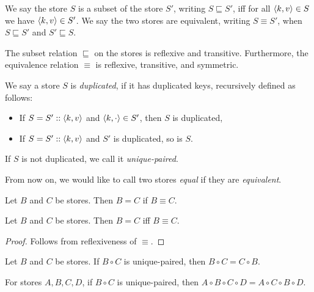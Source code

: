 \begin{definition}[Equivalence]
We say the store $S$ is a subset of the store $S'$, writing $S \sqsubseteq S'$, iff for all $\langle k, v \rangle \in S$ we have $\langle k, v \rangle \in S'$. We say the two stores are equivalent, writing $S \equiv S'$, when $S \sqsubseteq S'$ and $S' \sqsubseteq S$.
\end{definition}

\begin{lemma}
The subset relation $\sqsubseteq$ on the stores is reflexive and transitive. Furthermore, the equivalence relation $\equiv$ is reflexive, transitive, and symmetric.
\end{lemma}

\begin{definition}
We say a store $S$ is \textit{duplicated}, if it has duplicated keys, recursively defined as follows:
\begin{itemize}
    \item If $S = S' :: \langle k, v \rangle$ and $\left\langle k, \cdot \right\rangle \in S'$, then $S$ is duplicated,
    \item If $S = S' :: \langle k, v \rangle$ and $S'$ is duplicated, so is $S$.
\end{itemize}
If $S$ is not duplicated, we call it \textit{unique-paired}.
\end{definition}

From now on, we would like to call two stores \textit{equal} if they are \textit{equivalent}.

\begin{axiom}[Extensionality]
\label{axiom:extentionality}
Let $B$ and $C$ be stores. Then $B = C$ if $B \equiv C$.
\end{axiom}

\begin{corollary}
Let $B$ and $C$ be stores. Then $B = C$ iff $B \equiv C$.
\end{corollary}
\begin{proof}
Follows from reflexiveness of $\equiv$.
\end{proof}

\begin{theorem}[Commute]
\label{theorem:commute}
Let $B$ and $C$ be stores. If $B \circ C$ is unique-paired, then $B \circ C = C \circ B$.
\end{theorem}

\begin{corollary}[Exchange]
\label{corollary:exchange}
For stores $A, B, C, D$, if $B \circ C$ is unique-paired, then $A \circ B \circ C \circ D = A \circ C \circ B \circ D$.
\end{corollary}

